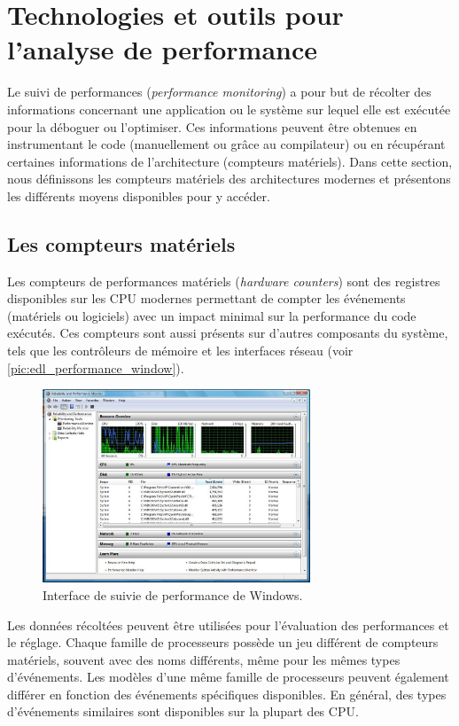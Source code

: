 \section{Technologies et outils pour l'analyse de performance}


Le suivi de performances (\textit{performance monitoring}) a pour but de récolter des informations concernant une application ou le système sur lequel elle est exécutée pour la déboguer ou l'optimiser. Ces informations peuvent être obtenues en instrumentant le code (manuellement ou grâce au compilateur) ou en récupérant certaines informations de l'architecture (compteurs matériels). Dans cette section, nous définissons les compteurs matériels des architectures modernes et présentons les différents moyens disponibles pour y accéder.


\subsection{Les compteurs matériels}

    Les compteurs de performances matériels (\textit{hardware counters}) sont des registres disponibles sur les CPU modernes permettant de compter les événements (matériels ou logiciels) avec un impact minimal sur la performance du code exécutés. Ces compteurs sont aussi présents sur d'autres composants du système, tels que les contrôleurs de mémoire et les interfaces réseau (voir \autoref{pic:edl_performance_window}).
    
     \begin{figure}[h!]
        \center
        \includegraphics[width=8cm]{images/edl_performance_window.jpg}
        \caption{\label{pic:edl_performance_window}Interface de suivie de performance de Windows.}
        \end{figure}
    
    
    Les données récoltées peuvent être utilisées pour l'évaluation des performances et le réglage. Chaque famille de processeurs possède un jeu différent de compteurs matériels, souvent avec des noms différents, même pour les mêmes types d'événements. Les modèles d'une même famille de processeurs peuvent également différer en fonction des événements spécifiques disponibles. En général, des types d'événements similaires sont disponibles sur la plupart des CPU.

